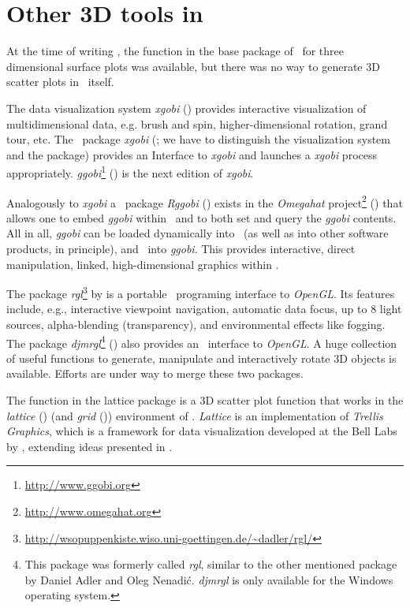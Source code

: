 \section{Other 3D tools in \RR\label{tools}}
At the time of writing \sdd , the function  in the base
package of \RR\ for three dimensional surface plots was available, but
there was no way to generate 3D scatter plots in \RR\ itself.

The data visualization system \emph{xgobi} (\cite{swayne98}) provides
interactive visualization of multidimensional data, e.g. brush and spin,
higher-dimensional rotation, grand tour, etc.  The \RR\ package
\emph{xgobi} (\cite{swayne91}; we have to distinguish the visualization
system and the package) provides an Interface to \emph{xgobi} and launches
a \emph{xgobi} process appropriately.
\emph{ggobi}\footnote{\url{http://www.ggobi.org}}
(\cite{swayne02}) is the next edition of \emph{xgobi}.

Analogously to \emph{xgobi} a \RR\ package \emph{Rggobi} (\cite{temple01})
exists in the \emph{Omegahat} project\footnote{\url{http://www.omegahat.org}}
(\cite{temple00}) that allows one to embed \emph{ggobi} within
\RR\ and to both set and query the \emph{ggobi} contents.  All in all,
\emph{ggobi} can be loaded dynamically into \RR\ (as well as into other
software products, in principle), and \RR\ into \emph{ggobi}.  This
provides interactive, direct manipulation, linked, high-dimensional
graphics within \RR .

The package \emph{rgl}\footnote{\url{http://wsopuppenkiste.wiso.uni-goettingen.de/~dadler/rgl/}}
by \cite{AdlerNenadic2003} is a portable \RR\ programing interface to \emph{OpenGL}.
Its features include, e.g., interactive viewpoint navigation,
automatic data focus, up to 8 light sources, alpha-blending
(transparency), and environmental effects like fogging.
The package \emph{djmrgl}\footnote{This package was
formerly called \emph{rgl}, similar to the other mentioned package
by Daniel Adler and Oleg Nenadi\'{c}.
\emph{djmrgl} is only available for the Windows operating system.}
(\cite{murdoch}) also provides an \RR\ interface to \emph{OpenGL}.
A huge collection of useful functions to generate,
manipulate and interactively rotate 3D objects is available.
Efforts are under way to merge these two packages.

The function  in the lattice package is a 3D scatter plot function that works in the
\emph{lattice} (\cite{sarkar02}) (and \emph{grid} (\cite{murrell01}))
environment of \RR .
\emph{Lattice} is an implementation of \emph{Trellis Graphics}, which is a
framework for data visualization developed at the Bell Labs by
, extending ideas presented in .

